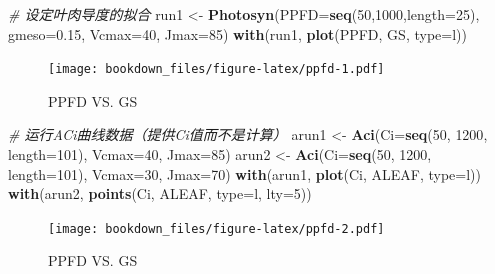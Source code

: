 \documentclass[
]{krantz}
\makeatletter
\newenvironment{Shaded}{\begin{snugshade}}{\end{snugshade}}
\newcommand{\CommentTok}[1]{\textcolor[rgb]{0.56,0.35,0.01}{\textit{#1}}}
\newcommand{\DataTypeTok}[1]{\textcolor[rgb]{0.13,0.29,0.53}{#1}}
\newcommand{\DecValTok}[1]{\textcolor[rgb]{0.00,0.00,0.81}{#1}}
\newcommand{\FloatTok}[1]{\textcolor[rgb]{0.00,0.00,0.81}{#1}}
\newcommand{\KeywordTok}[1]{\textcolor[rgb]{0.13,0.29,0.53}{\textbf{#1}}}
\newcommand{\NormalTok}[1]{#1}
\newcommand{\StringTok}[1]{\textcolor[rgb]{0.31,0.60,0.02}{#1}}
\newenvironment{kframe}{%
\medskip{}
\setlength{\fboxsep}{.8em}
 \def\at@end@of@kframe{}%
 \ifinner\ifhmode%
  \def\at@end@of@kframe{\end{minipage}}%
  \begin{minipage}{\columnwidth}%
 \fi\fi%
 \def\FrameCommand##1{\hskip\@totalleftmargin \hskip-\fboxsep
 \colorbox{shadecolor}{##1}\hskip-\fboxsep
     \hskip-\linewidth \hskip-\@totalleftmargin \hskip\columnwidth}%
 \MakeFramed {\advance\hsize-\width
   \@totalleftmargin\z@ \linewidth\hsize
   \@setminipage}}%
 {\par\unskip\endMakeFramed%
 \at@end@of@kframe}
\renewenvironment{Shaded}{\begin{kframe}}{\end{kframe}}
\makeatother
\begin{document}
\begin{Shaded}
\begin{Highlighting}[]
\CommentTok{\# 设定叶肉导度的拟合}
\NormalTok{run1 \textless{}{-}}\StringTok{ }\KeywordTok{Photosyn}\NormalTok{(}\DataTypeTok{PPFD=}\KeywordTok{seq}\NormalTok{(}\DecValTok{50}\NormalTok{,}\DecValTok{1000}\NormalTok{,}\DataTypeTok{length=}\DecValTok{25}\NormalTok{), }
                 \DataTypeTok{gmeso=}\FloatTok{0.15}\NormalTok{, }\DataTypeTok{Vcmax=}\DecValTok{40}\NormalTok{, }\DataTypeTok{Jmax=}\DecValTok{85}\NormalTok{)}
\KeywordTok{with}\NormalTok{(run1, }\KeywordTok{plot}\NormalTok{(PPFD, GS, }\DataTypeTok{type=}\StringTok{\textquotesingle{}l\textquotesingle{}}\NormalTok{))}
\end{Highlighting}
\end{Shaded}

\begin{figure}
\centering
\texttt{[image: bookdown\_files/figure-latex/ppfd-1.pdf]}
\caption{\label{fig:ppfd-1}PPFD VS. GS}
\end{figure}

\begin{Shaded}
\begin{Highlighting}[]
\CommentTok{\# 运行ACi曲线数据（提供Ci值而不是计算）}
\NormalTok{arun1 \textless{}{-}}\StringTok{ }\KeywordTok{Aci}\NormalTok{(}\DataTypeTok{Ci=}\KeywordTok{seq}\NormalTok{(}\DecValTok{50}\NormalTok{, }\DecValTok{1200}\NormalTok{, }\DataTypeTok{length=}\DecValTok{101}\NormalTok{), }
             \DataTypeTok{Vcmax=}\DecValTok{40}\NormalTok{, }\DataTypeTok{Jmax=}\DecValTok{85}\NormalTok{)}
\NormalTok{arun2 \textless{}{-}}\StringTok{ }\KeywordTok{Aci}\NormalTok{(}\DataTypeTok{Ci=}\KeywordTok{seq}\NormalTok{(}\DecValTok{50}\NormalTok{, }\DecValTok{1200}\NormalTok{, }\DataTypeTok{length=}\DecValTok{101}\NormalTok{), }
             \DataTypeTok{Vcmax=}\DecValTok{30}\NormalTok{, }\DataTypeTok{Jmax=}\DecValTok{70}\NormalTok{)}
\KeywordTok{with}\NormalTok{(arun1, }\KeywordTok{plot}\NormalTok{(Ci, ALEAF, }\DataTypeTok{type=}\StringTok{\textquotesingle{}l\textquotesingle{}}\NormalTok{))}
\KeywordTok{with}\NormalTok{(arun2, }\KeywordTok{points}\NormalTok{(Ci, ALEAF, }\DataTypeTok{type=}\StringTok{\textquotesingle{}l\textquotesingle{}}\NormalTok{, }\DataTypeTok{lty=}\DecValTok{5}\NormalTok{))}
\end{Highlighting}
\end{Shaded}

\begin{figure}
\centering
\texttt{[image: bookdown\_files/figure-latex/ppfd-2.pdf]}
\caption{\label{fig:ppfd-2}PPFD VS. GS}
\end{figure}
\end{document}
